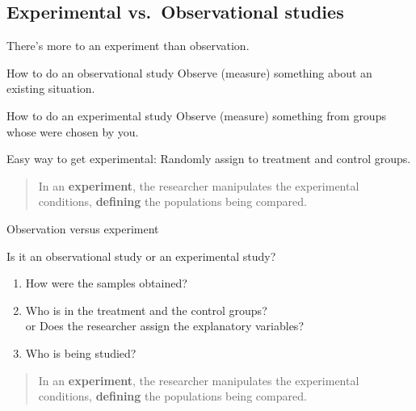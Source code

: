 \subsection{Experimental vs.\ Observational studies}

\begin{frame}{There's more to an experiment than observation.}

  \begin{block}{How to do an observational study}
    \alert{Observe} (measure) something about an existing situation.
  \end{block}

  \vspace{2em}

  \begin{block}{How to do an experimental study}
    Observe (measure) something
    from groups whose  were \alert{chosen} by you.
  \end{block}

  \vspace{2em}

  \alert{Easy way to get experimental:}
  Randomly assign to treatment and control groups.

  \vspace{2em}

  \begin{quote}
    In an \textbf{experiment}, the researcher manipulates the experimental conditions,
    \textbf{defining} the populations being compared.
  \end{quote}

\end{frame}

%
\begin{frame}{Observation versus experiment}

  Is it an observational study or an experimental study?
  \begin{enumerate}

    \item How were the samples obtained?

    \item Who is in the treatment and the control groups? \\
      \alert{or} Does the researcher assign the explanatory variables?

    \item Who is being studied?

  \end{enumerate}

  \vspace{2em}

  \begin{quote}
    In an \textbf{experiment}, the researcher manipulates the experimental conditions,
    \textbf{defining} the populations being compared.
  \end{quote}

\end{frame}

